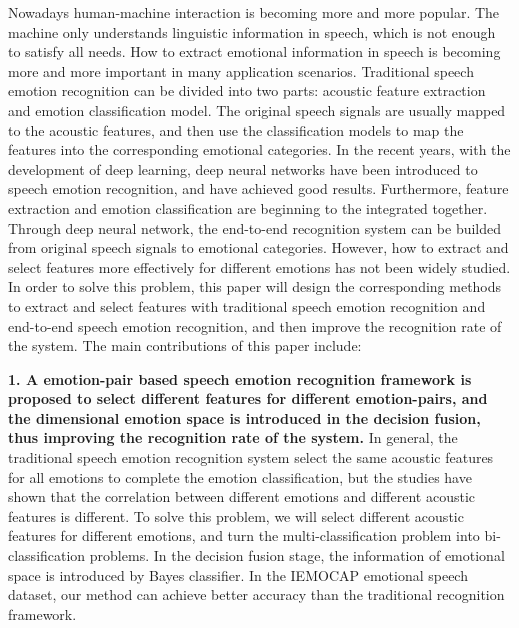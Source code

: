 
\begin{eabstract}
  Nowadays human-machine interaction is becoming more and more popular. The machine only understands linguistic information in speech, which is not enough to satisfy all needs. How to extract emotional information in speech is becoming more and more important in many application scenarios. Traditional speech emotion recognition can be divided into two parts: acoustic feature extraction and emotion classification model. The original speech signals are usually mapped to the acoustic features, and then use the classification models to map the features into the corresponding emotional categories. In the recent years, with the development of deep learning, deep neural networks have been introduced to speech emotion recognition, and have achieved good results. Furthermore, feature extraction and emotion classification are beginning to the integrated together. Through deep neural network, the end-to-end recognition system can be builded from original speech signals to emotional categories. However, how to extract and select features more effectively for different emotions has not been widely studied. In order to solve this problem, this paper will design the corresponding methods to extract and select features with traditional speech emotion recognition and end-to-end speech emotion recognition, and then improve the recognition rate of the system. The main contributions of this paper include:

\textbf{1. A emotion-pair based speech emotion recognition framework is proposed to select different features for different emotion-pairs, and the dimensional emotion space is introduced in the decision fusion, thus improving the recognition rate of the system.}  In general, the traditional speech emotion recognition system select the same acoustic features for all emotions to complete the emotion classification, but the studies have shown that the correlation between different emotions and different acoustic features is different. To solve this problem, we will select different acoustic features for different emotions, and turn the multi-classification problem into bi-classification problems. In the decision fusion stage, the information of emotional space is introduced by Bayes classifier. In the IEMOCAP emotional speech dataset, our method can achieve better accuracy than the traditional recognition framework.


\end{eabstract}
